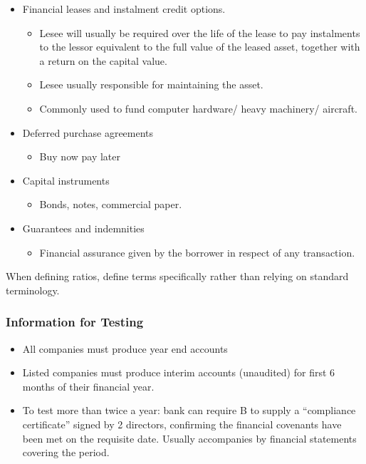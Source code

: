 \documentclass[
]{article}
\providecommand{\tightlist}{%
  \setlength{\itemsep}{0pt}\setlength{\parskip}{0pt}}
\begin{document}
\begin{itemize}
\tightlist
\item
  Financial leases and instalment credit options.

  \begin{itemize}
  \tightlist
  \item
    Lesee will usually be required over the life of the lease to pay
    instalments to the lessor equivalent to the full value of the leased
    asset, together with a return on the capital value.
  \item
    Lesee usually responsible for maintaining the asset.
  \item
    Commonly used to fund computer hardware/ heavy machinery/ aircraft.
  \end{itemize}
\item
  Deferred purchase agreements

  \begin{itemize}
  \tightlist
  \item
    Buy now pay later
  \end{itemize}
\item
  Capital instruments

  \begin{itemize}
  \tightlist
  \item
    Bonds, notes, commercial paper.
  \end{itemize}
\item
  Guarantees and indemnities

  \begin{itemize}
  \tightlist
  \item
    Financial assurance given by the borrower in respect of any
    transaction.
  \end{itemize}
\end{itemize}

When defining ratios, define terms specifically rather than relying on
standard terminology.

\hypertarget{information-for-testing}{%
\subsubsection{Information for Testing}\label{information-for-testing}}

\begin{itemize}
\tightlist
\item
  All companies must produce year end accounts
\item
  Listed companies must produce interim accounts (unaudited) for first 6
  months of their financial year.
\item
  To test more than twice a year: bank can require B to supply a
  ``compliance certificate'' signed by 2 directors, confirming the
  financial covenants have been met on the requisite date. Usually
  accompanies by financial statements covering the period.
\end{itemize}
\end{document}
